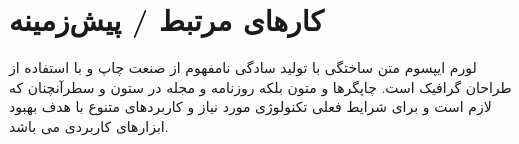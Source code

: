 \section{کار‌های مرتبط / پیش‌زمینه}
لورم ایپسوم متن ساختگی با تولید سادگی نامفهوم از صنعت چاپ و با استفاده از طراحان گرافیک است. چاپگرها و متون بلکه روزنامه و مجله در ستون و سطرآنچنان که لازم است و برای شرایط فعلی تکنولوژی مورد نیاز و کاربردهای متنوع با هدف بهبود ابزارهای کاربردی می باشد.
